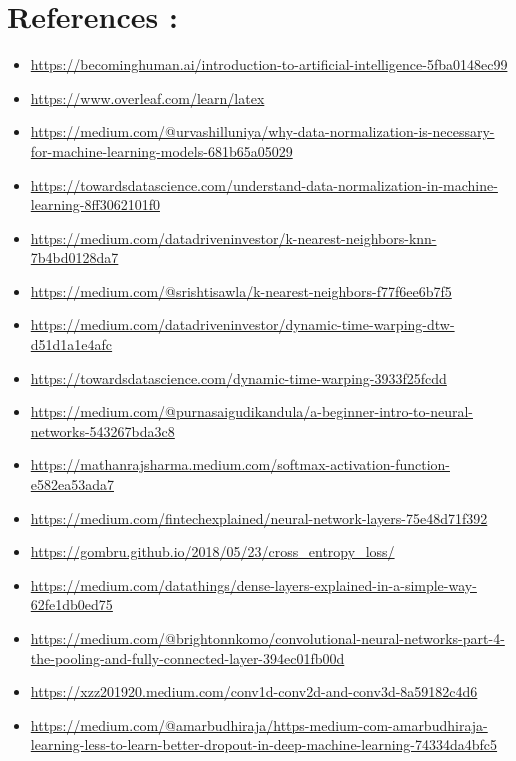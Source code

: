 \documentclass[10pt,a4paper]{article}
\begin{document}
\section{References :}

\begin{itemize}

\item \textcolor{blue}{\url{https://becominghuman.ai/introduction-to-artificial-intelligence-5fba0148ec99}}
\item \textcolor{blue}{\url{https://www.overleaf.com/learn/latex}}
\item \textcolor{blue}{\url{https://medium.com/@urvashilluniya/why-data-normalization-is-necessary-for-machine-learning-models-681b65a05029}}
\item \textcolor{blue}{\url{https://towardsdatascience.com/understand-data-normalization-in-machine-learning-8ff3062101f0}}
\item \textcolor{blue}{\url{https://medium.com/datadriveninvestor/k-nearest-neighbors-knn-7b4bd0128da7}}
\item \textcolor{blue}{\url{https://medium.com/@srishtisawla/k-nearest-neighbors-f77f6ee6b7f5}}
\item \textcolor{blue}{\url{https://medium.com/datadriveninvestor/dynamic-time-warping-dtw-d51d1a1e4afc}}
\item \textcolor{blue}{\url{https://towardsdatascience.com/dynamic-time-warping-3933f25fcdd}}
\item \textcolor{blue}{\url{https://medium.com/@purnasaigudikandula/a-beginner-intro-to-neural-networks-543267bda3c8}}
\item \textcolor{blue}{\url{https://mathanrajsharma.medium.com/softmax-activation-function-e582ea53ada7}}
\item \textcolor{blue}{\url{https://medium.com/fintechexplained/neural-network-layers-75e48d71f392}}
\item \textcolor{blue}{\url{https://gombru.github.io/2018/05/23/cross_entropy_loss/}}
\item \textcolor{blue}{\url{https://medium.com/datathings/dense-layers-explained-in-a-simple-way-62fe1db0ed75}}
\item \textcolor{blue}{\url{https://medium.com/@brightonnkomo/convolutional-neural-networks-part-4-the-pooling-and-fully-connected-layer-394ec01fb00d}}
\item \textcolor{blue}{\url{https://xzz201920.medium.com/conv1d-conv2d-and-conv3d-8a59182c4d6}}
\item \textcolor{blue}{\url{https://medium.com/@amarbudhiraja/https-medium-com-amarbudhiraja-learning-less-to-learn-better-dropout-in-deep-machine-learning-74334da4bfc5}}

\end{itemize}
\end{document}
